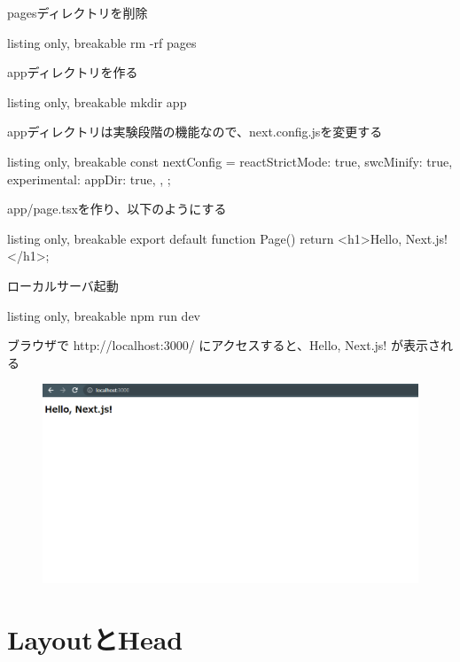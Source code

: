 pagesディレクトリを削除
\begin{tcblisting}{listing only, breakable}
  rm -rf pages
\end{tcblisting}

appディレクトリを作る
\begin{tcblisting}{listing only, breakable}
  mkdir app
\end{tcblisting}


appディレクトリは実験段階の機能なので、next.config.jsを変更する

\begin{tcblisting}{listing only, breakable}
  const nextConfig = {
  reactStrictMode: true,
  swcMinify: true,
  experimental: {
  appDir: true,
  },
  };
\end{tcblisting}

app/page.tsxを作り、以下のようにする



\begin{tcblisting}{listing only, breakable}
  export default function Page() {
      return <h1>Hello, Next.js!</h1>;
    }
\end{tcblisting}




ローカルサーバ起動


\begin{tcblisting}{listing only, breakable}
  npm run dev
\end{tcblisting}



ブラウザで http://localhost:3000/ にアクセスすると、Hello, Next.js! が表示される

\begin{figure}[H]
  \centering
  \includegraphics[width=12cm]{./image/03-Tech/chap4/01.png}
\end{figure}




\section{LayoutとHead
 }

